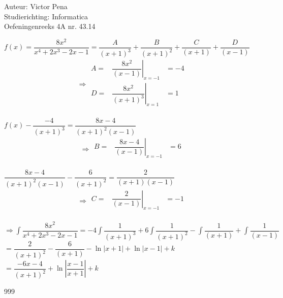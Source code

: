 \documentclass[a4paper]{article}
\begin{document}
	
	\noindent \large Auteur: Victor Pena \\
	\noindent \large Studierichting: Informatica\\
	\noindent \large Oefeningenreeks 4A nr. 43.14\\
	
	\medskip
	
	\normalsize 
	
	$f(x)=\dfrac{8x^2}{x^4+2x^3-2x-1}=   \dfrac{A}{(x+1)^3} +  \dfrac{B}{(x+1)^2} + \dfrac{C}{(x+1)} + \dfrac{D}{(x-1)}$ \\
 
	
	$$\Rightarrow \begin{array}{ccc}
	A=&\left.\dfrac{8x^2}{(x-1)}\right|_{x=-1}&=-4 \\
	D=&\left.\dfrac{8x^2}{(x+1)^3}\right|_{x=1}&=1 \\
	\end{array}$$
	
	$f(x) - \dfrac{-4}{(x+1)^3} = \dfrac{8x-4}{(x+1)^2(x-1)}$\\
	
	$$\Rightarrow \begin{array}{ccc}
	B=&\left.\dfrac{8x-4}{(x-1)}\right|_{x=-1}&=6 \\
	\end{array}$$ 
	
	$\dfrac{8x-4}{(x+1)^2(x-1)} - \dfrac{6}{(x+1)^2} = \dfrac{2}{(x+1)(x-1)}$\\
	
	$$\Rightarrow \begin{array}{ccc}
	C=&\left.\dfrac{2}{(x-1)}\right|_{x=-1}&=-1 \\
	\end{array}$$ 
	
	$\Rightarrow \displaystyle\int \dfrac{8x^2}{x^4+2x^3-2x-1} = -4\displaystyle\int\dfrac{1}{(x+1)^3} +  6\displaystyle\int\dfrac{1}{(x+1)^2} - \displaystyle\int\dfrac{1}{(x+1)} + \displaystyle\int\dfrac{1}{(x-1)} $ \\ 
	
	$= \dfrac{2}{(x+1)^2} - \dfrac{6}{(x+1)} - \ln|x+1| + \ln|x-1| + k$\\
	
	$= \dfrac{-6x-4}{(x+1)^2} + \ln\left|\dfrac{x-1}{x+1}\right| + k$
	
	
	\begin{thebibliography}{999}
	\end{thebibliography}
\end{document}
